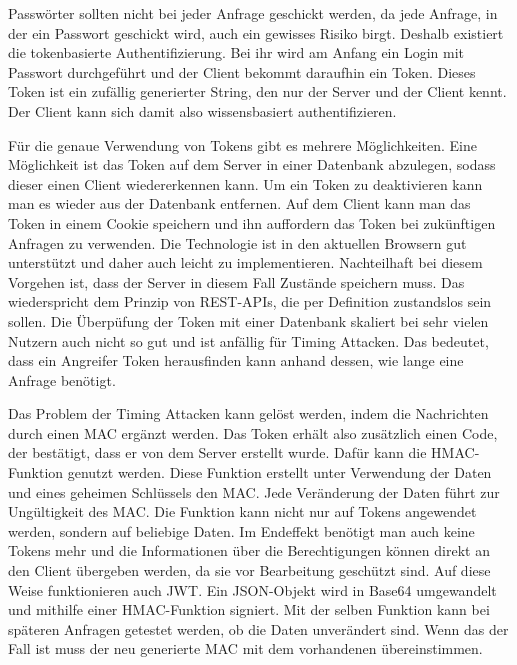 Passwörter sollten nicht bei jeder Anfrage geschickt werden, da jede Anfrage, in der ein Passwort geschickt wird, auch ein gewisses Risiko birgt. Deshalb existiert die tokenbasierte Authentifizierung. Bei ihr wird am Anfang ein Login mit Passwort durchgeführt und der Client bekommt daraufhin ein Token. Dieses Token ist ein zufällig generierter String, den nur der Server und der Client kennt. Der Client kann sich damit also wissensbasiert authentifizieren. 

Für die genaue Verwendung von Tokens gibt es mehrere Möglichkeiten. Eine Möglichkeit ist das Token auf dem Server in einer Datenbank abzulegen, sodass dieser einen Client wiedererkennen kann. Um ein Token zu deaktivieren kann man es wieder aus der Datenbank entfernen. Auf dem Client kann man das Token in einem Cookie speichern und ihn auffordern das Token bei zukünftigen Anfragen zu verwenden. Die Technologie ist in den aktuellen Browsern gut unterstützt und daher auch leicht zu implementieren. Nachteilhaft bei diesem Vorgehen ist, dass der Server in diesem Fall Zustände speichern muss. Das wiederspricht dem Prinzip von REST-APIs, die per Definition zustandslos sein sollen. Die Überpüfung der Token mit einer Datenbank skaliert bei sehr vielen Nutzern auch nicht so gut und ist anfällig für Timing Attacken. Das bedeutet, dass ein Angreifer Token herausfinden kann anhand dessen, wie lange eine Anfrage benötigt.

Das Problem der Timing Attacken kann gelöst werden, indem die Nachrichten durch einen \ac{MAC} ergänzt werden. Das Token erhält also zusätzlich einen Code, der bestätigt, dass er von dem Server erstellt wurde. Dafür kann die \ac{HMAC}-Funktion genutzt werden. Diese Funktion erstellt unter Verwendung der Daten und eines geheimen Schlüssels den \ac{MAC}. Jede Veränderung der Daten führt zur Ungültigkeit des \ac{MAC}. Die Funktion kann nicht nur auf Tokens angewendet werden, sondern auf beliebige Daten. Im Endeffekt benötigt man auch keine Tokens mehr und die Informationen über die Berechtigungen können direkt an den Client übergeben werden, da sie vor Bearbeitung geschützt sind. Auf diese Weise funktionieren auch \ac{JWT}. Ein JSON-Objekt wird in Base64 umgewandelt und mithilfe einer \ac{HMAC}-Funktion signiert. Mit der selben Funktion kann bei späteren Anfragen getestet werden, ob die Daten unverändert sind. Wenn das der Fall ist muss der neu generierte \ac{MAC} mit dem vorhandenen übereinstimmen.
\cite{madden_api_2020,software_development_engineering_advisor_at_fiserv_usa_architecting_2023}


